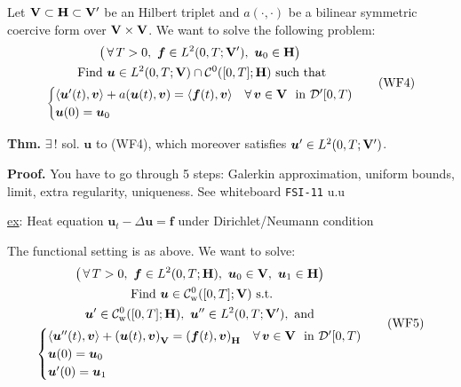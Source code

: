 \noindent\rlap{\rule[1.5ex]{0.495\textwidth}{.2pt}}


Let $\mathbf{V}\subset\mathbf{H}\subset\mathbf{V}'$ be an Hilbert triplet and $a(\cdot,\cdot)$ be a bilinear symmetric coercive form over $\mathbf{V}\times\mathbf{V}$. We want to solve the following problem:
\begin{equation*}
\begin{gathered}
\big(\,\forall\,T>0,\ \bm f\in L^2(0,T;\mathbf{V}'),\ \bm u_0\in\mathbf{H} \big)\\
\text{ Find }\bm u\in L^2(0,T;\mathbf{V})\cap\mathcal{C}^0([0,T];\mathbf{H}) \text{ such that} \\ 
\begin{cases}
\langle \bm u'(t),\bm v \rangle + a(\bm u(t),\bm v)= \langle \bm f(t),\bm v \rangle &\forall\, \bm v\in\mathbf{V}\ \text{ in }\mathcal{D}'[0,T) \\
\bm u(0)=\bm u_0
\end{cases}   
\end{gathered}
\tag{WF4}
\end{equation*}

\textbf{Thm.} $\exists\,!$ sol. $\bm u$ to (WF4), which moreover satisfies $\bm u'\in L^2(0,T;\mathbf{V}')$.

\smallskip

\textbf{\color{lavender(floral)}Proof.} You have to go through 5 steps: Galerkin approximation, uniform bounds, limit, extra regularity, uniqueness. See whiteboard \texttt{FSI-11} u.u

\smallskip

\underline{ex}: Heat equation $\bm u_t-\Delta\bm u=\bm f$ under Dirichlet/Neumann condition

\noindent\rlap{\rule[1.5ex]{0.495\textwidth}{.2pt}}


The functional setting is as above. We want to solve:
\begin{equation*}
\begin{gathered}
\big(\,\forall\,T>0,\ \bm f\in L^2(0,T;\mathbf{H}),\ \bm u_0\in\mathbf{V},\ \bm u_1\in\mathbf{H} \big)\\
\text{ Find }\bm u\in \mathcal{C}^0_{\mathrm{w}}([0,T];\mathbf{V}) \text{ s.t.} \\
\bm u'\in \mathcal{C}^0_{\mathrm{w}}([0,T];\mathbf{H}),\ \bm u''\in L^2(0,T;\mathbf{V}'), \text{ and} \\
\begin{cases}
\langle \bm u''(t),\bm v \rangle + \left(\bm u(t),\bm v\right)_{\mathbf{V}}= \left( \bm f(t),\bm v \right)_{\mathbf{H}} &\forall\, \bm v\in\mathbf{V}\ \text{ in }\mathcal{D}'[0,T) \\
\bm u(0)=\bm u_0 \\
\bm u'(0)=\bm u_1
\end{cases}   
\end{gathered}
\tag{WF5}
\end{equation*}

